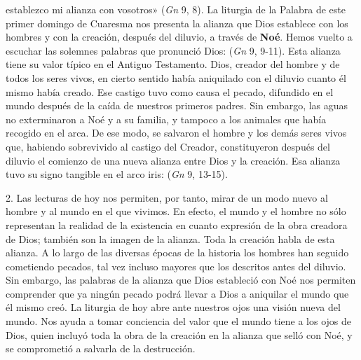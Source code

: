 \begin{body}
 establezco mi alianza con vosotros» (\textit{Gn} 9, 8). La liturgia de la Palabra de este primer domingo de Cuaresma nos presenta la alianza que Dios establece con los hombres y con la creación, después del diluvio, a través de \textbf{Noé}. Hemos vuelto a escuchar las solemnes palabras que pronunció Dios:  (\textit{Gn} 9, 9-11). Esta alianza tiene su valor típico en el Antiguo Testamento. Dios, creador del hombre y de todos los seres vivos, en cierto sentido había aniquilado con el diluvio cuanto él mismo había creado. Ese castigo tuvo como causa el pecado, difundido en el mundo después de la caída de nuestros primeros padres. Sin embargo, las aguas no exterminaron a Noé y a su familia, y tampoco a los animales que había recogido en el arca. De ese modo, se salvaron el hombre y los demás seres vivos que, habiendo sobrevivido al castigo del Creador, constituyeron después del diluvio el comienzo de una nueva alianza entre Dios y la creación. Esa alianza tuvo su signo tangible en el arco iris:  (\textit{Gn} 9, 13-15).

2. Las lecturas de hoy nos permiten, por tanto, mirar de un modo nuevo al hombre y al mundo en el que vivimos. En efecto, el mundo y el hombre no sólo representan la realidad de la existencia en cuanto expresión de la obra creadora de Dios; también son la imagen de la alianza. Toda la creación habla de esta alianza. A lo largo de las diversas épocas de la historia los hombres han seguido cometiendo pecados, tal vez incluso mayores que los descritos antes del diluvio. Sin embargo, las palabras de la alianza que Dios estableció con Noé nos permiten comprender que ya ningún pecado podrá llevar a Dios a aniquilar el mundo que él mismo creó. La liturgia de hoy abre ante nuestros ojos una visión nueva del mundo. Nos ayuda a tomar conciencia del valor que el mundo tiene a los ojos de Dios, quien incluyó toda la obra de la creación en la alianza que selló con Noé, y se comprometió a salvarla de la destrucción.


\end{body}
